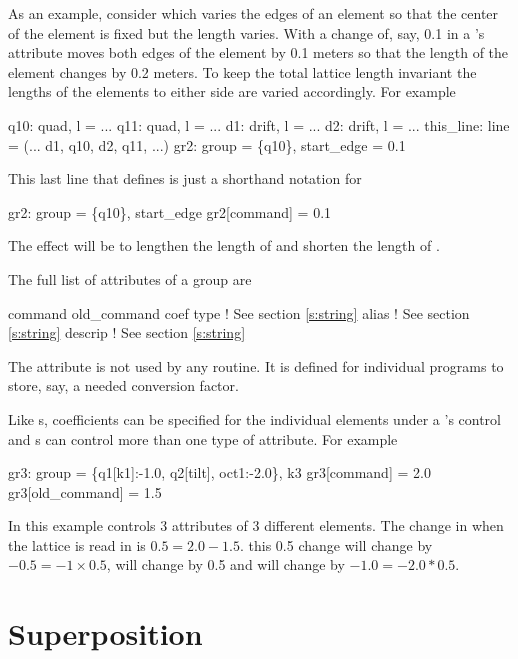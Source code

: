 As an example, consider  which varies the edges of
an element so that the center of the element is fixed but the length
varies. With  a change of, say, 0.1 in a
's  attribute moves both edges of the element by
0.1 meters so that the length of the element changes by 0.2 meters. To
keep the total lattice length invariant the lengths of the elements to
either side are varied accordingly. For example
\begin{example}
  q10: quad, l = ...
  q11: quad, l = ...
  d1: drift, l = ...
  d2: drift, l = ...
  this_line: line = (... d1, q10, d2, q11, ...)
  gr2: group = \{q10\}, start_edge = 0.1
\end{example}
This last line that defines  is just a shorthand notation for
\begin{example}
  gr2: group = \{q10\}, start_edge 
  gr2[command] = 0.1
\end{example}
The effect will be to lengthen the length of  and shorten the
length of .

The full list of attributes of a group are
\begin{example}
  command         
  old_command     
  coef            
  type            ! See section \ref{s:string}
  alias           ! See section \ref{s:string}
  descrip         ! See section \ref{s:string}
\end{example}
The  attribute is not used by any \bmad routine. It is
defined for individual programs to store, say, a needed conversion
factor.

Like s, coefficients can be specified for the individual
elements under a 's control and s can control more
than one type of attribute. For example
\begin{example}
  gr3: group = \{q1[k1]:-1.0, q2[tilt], oct1:-2.0\}, k3
  gr3[command] = 2.0
  gr3[old_command] = 1.5
\end{example}
In this example  controls 3 attributes of 3 different
elements. The change in  when the lattice is read in is $0.5
= 2.0 - 1.5$. this 0.5 change will change  by $-0.5 = -1
\times 0.5$,  will change by 0.5 and  will
change by $-1.0 = -2.0 * 0.5$.

\section{Superposition}
\label{s:super}

